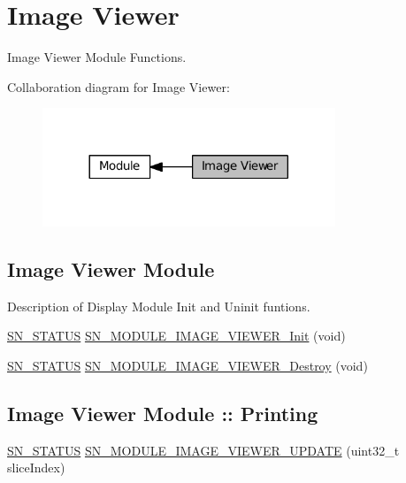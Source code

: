 \hypertarget{group__MODULE__IMAGE__VIEWER}{}\section{Image Viewer}
\label{group__MODULE__IMAGE__VIEWER}


Image Viewer Module Functions.  


Collaboration diagram for Image Viewer\+:\nopagebreak
\begin{figure}[H]
\begin{center}
\leavevmode
\includegraphics[width=248pt]{group__MODULE__IMAGE__VIEWER}
\end{center}
\end{figure}
\subsection*{Image Viewer Module}
\label{_amgrpfad8b2c2d595abc0721d685d1c68c286}%
Description of Display Module Init and Uninit funtions. \begin{DoxyCompactItemize}
\item 
\hyperlink{group__SYSTEM__ERROR_ga4540713b9a7a18ce44d78c3a10f7442f}{S\+N\+\_\+\+S\+T\+A\+T\+US} \hyperlink{group__MODULE__IMAGE__VIEWER_gafd26cb5c7532488dc8e0c37f07d16092}{S\+N\+\_\+\+M\+O\+D\+U\+L\+E\+\_\+\+I\+M\+A\+G\+E\+\_\+\+V\+I\+E\+W\+E\+R\+\_\+\+Init} (void)
\item 
\hyperlink{group__SYSTEM__ERROR_ga4540713b9a7a18ce44d78c3a10f7442f}{S\+N\+\_\+\+S\+T\+A\+T\+US} \hyperlink{group__MODULE__IMAGE__VIEWER_gae8357323213bf36b0a0011974f7c43dc}{S\+N\+\_\+\+M\+O\+D\+U\+L\+E\+\_\+\+I\+M\+A\+G\+E\+\_\+\+V\+I\+E\+W\+E\+R\+\_\+\+Destroy} (void)
\end{DoxyCompactItemize}
\subsection*{Image Viewer Module \+:\+: Printing}
\begin{DoxyCompactItemize}
\item 
\hyperlink{group__SYSTEM__ERROR_ga4540713b9a7a18ce44d78c3a10f7442f}{S\+N\+\_\+\+S\+T\+A\+T\+US} \hyperlink{group__MODULE__IMAGE__VIEWER_ga16b58f3bf4681b8ccda18d88490456a7}{S\+N\+\_\+\+M\+O\+D\+U\+L\+E\+\_\+\+I\+M\+A\+G\+E\+\_\+\+V\+I\+E\+W\+E\+R\+\_\+\+U\+P\+D\+A\+TE} (uint32\+\_\+t slice\+Index)
\end{DoxyCompactItemize}
